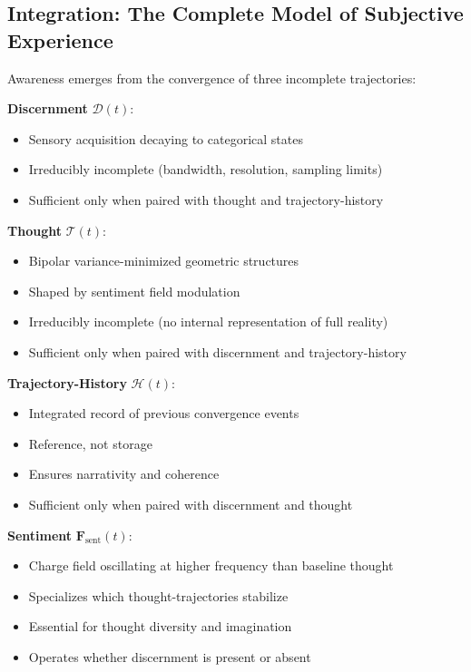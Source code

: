 \subsection{Integration: The Complete Model of Subjective Experience}

\begin{principle}
\label{prin:unified-model}
Awareness emerges from the convergence of three incomplete trajectories:

\textbf{Discernment} $\mathcal{D}(t)$:
\begin{itemize}
\item Sensory acquisition decaying to categorical states
\item Irreducibly incomplete (bandwidth, resolution, sampling limits)
\item Sufficient only when paired with thought and trajectory-history
\end{itemize}

\textbf{Thought} $\mathcal{T}(t)$:
\begin{itemize}
\item Bipolar variance-minimized geometric structures
\item Shaped by sentiment field modulation
\item Irreducibly incomplete (no internal representation of full reality)
\item Sufficient only when paired with discernment and trajectory-history
\end{itemize}

\textbf{Trajectory-History} $\mathcal{H}(t)$:
\begin{itemize}
\item Integrated record of previous convergence events
\item Reference, not storage
\item Ensures narrativity and coherence
\item Sufficient only when paired with discernment and thought
\end{itemize}

\textbf{Sentiment} $\mathbf{F}_{\text{sent}}(t)$:
\begin{itemize}
\item Charge field oscillating at higher frequency than baseline thought
\item Specializes which thought-trajectories stabilize
\item Essential for thought diversity and imagination
\item Operates whether discernment is present or absent
\end{itemize}


\end{principle}
